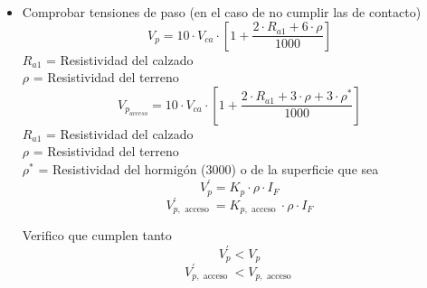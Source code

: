 \documentclass[10pt,a4paper]{article}
\begin{document}
\begin{itemize}
    \item Comprobar tensiones de paso (en el caso de no cumplir las de contacto)
    $$
    V_{p}=10 \cdot V_{c a} \cdot\left[1+\frac{2 \cdot R_{a 1}+6 \cdot \rho}{1000}\right]
    $$
     $R_{a1}$ = Resistividad del calzado \\
     $ \rho$ = Resistividad del terreno 
     \\
     
    $$
    V_{p_{acceso}}=10 \cdot V_{c a} \cdot\left[1+\frac{2 \cdot R_{a 1}+3 \cdot \rho + 3 \cdot \rho^*}{1000}\right]
    $$
    $R_{a1}$ = Resistividad del calzado \\
     $ \rho$ = Resistividad del terreno \\
     $ \rho^*$ = Resistividad del hormigón (3000) o de la superficie que sea \\
     
     $$
    V_{p}^{\prime}=K_{p} \cdot \rho \cdot I_{F}
    $$
    $$
    V_{p, \text { acceso }}^{\prime}=K_{p, \text { acceso }} \cdot \rho \cdot I_{F}
    $$
    
    Verifico que cumplen tanto
    $$
    V_{p}^{\prime}<V_{p} 
    $$
    $$
    V_{p, \text { acceso }}^{\prime}<V_{p, \text { acceso }}
    $$
\end{itemize}
\end{document}
